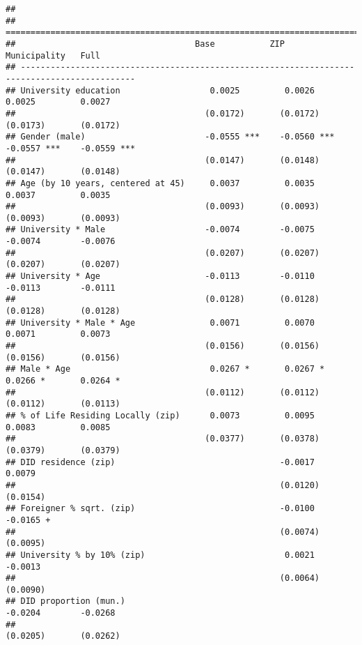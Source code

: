 \documentclass[
]{article}
\begin{document}
\begin{verbatim}
## 
## =============================================================================================
##                                    Base           ZIP            Municipality   Full         
## ---------------------------------------------------------------------------------------------
## University education                  0.0025         0.0026         0.0025         0.0027    
##                                      (0.0172)       (0.0172)       (0.0173)       (0.0172)   
## Gender (male)                        -0.0555 ***    -0.0560 ***    -0.0557 ***    -0.0559 ***
##                                      (0.0147)       (0.0148)       (0.0147)       (0.0148)   
## Age (by 10 years, centered at 45)     0.0037         0.0035         0.0037         0.0035    
##                                      (0.0093)       (0.0093)       (0.0093)       (0.0093)   
## University * Male                    -0.0074        -0.0075        -0.0074        -0.0076    
##                                      (0.0207)       (0.0207)       (0.0207)       (0.0207)   
## University * Age                     -0.0113        -0.0110        -0.0113        -0.0111    
##                                      (0.0128)       (0.0128)       (0.0128)       (0.0128)   
## University * Male * Age               0.0071         0.0070         0.0071         0.0073    
##                                      (0.0156)       (0.0156)       (0.0156)       (0.0156)   
## Male * Age                            0.0267 *       0.0267 *       0.0266 *       0.0264 *  
##                                      (0.0112)       (0.0112)       (0.0112)       (0.0113)   
## % of Life Residing Locally (zip)      0.0073         0.0095         0.0083         0.0085    
##                                      (0.0377)       (0.0378)       (0.0379)       (0.0379)   
## DID residence (zip)                                 -0.0017                        0.0079    
##                                                     (0.0120)                      (0.0154)   
## Foreigner % sqrt. (zip)                             -0.0100                       -0.0165 +  
##                                                     (0.0074)                      (0.0095)   
## University % by 10% (zip)                            0.0021                       -0.0013    
##                                                     (0.0064)                      (0.0090)   
## DID proportion (mun.)                                              -0.0204        -0.0268    
##                                                                    (0.0205)       (0.0262)   

\end{verbatim}
\end{document}

